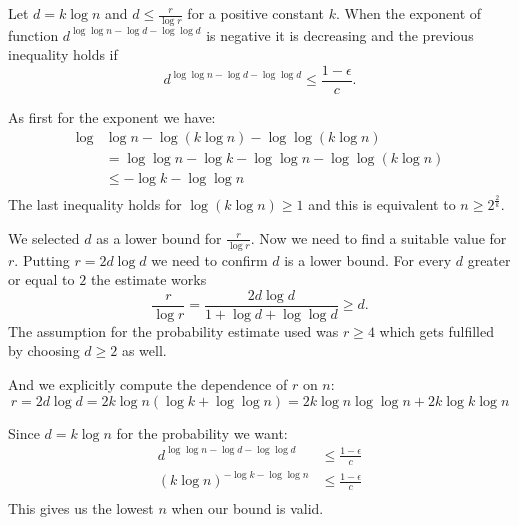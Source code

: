 Let $d = k \log n$ and $d \leq \frac{r}{\log r}$ for a positive constant $k$. When the exponent of function $d^{\log \log n -\log d - \log \log d}$ is negative it is decreasing and the previous inequality holds if
\begin{displaymath}
d ^ {\log \log n - \log d -\log \log d} \leq \frac{1 - \epsilon}{c}\textit{.}
\end{displaymath}

As first for the exponent we have:
\begin{displaymath}
\begin{split}
\log & \log n - \log (k \log n) - \log \log (k \log n) \\
	& = \log \log n - \log k - \log\log n - \log \log (k \log n) \\
	& \leq - \log k - \log \log n \\
\end{split}
\end{displaymath}
The last inequality holds for $\log (k \log n) \geq 1$ and this is equivalent to $n \geq 2^{\frac{2}{k}}$.

We selected $d$ as a lower bound for $\frac{r}{\log r}$. Now we need to find a suitable value for $r$. Putting $r = 2 d \log d$ we need to confirm $d$ is a lower bound. For every $d$ greater or equal to $2$ the estimate works
\begin{displaymath}
\frac{r}{\log r} = \frac{2 d \log d}{1 + \log d + \log \log d} \geq d \textit{.}
\end{displaymath}
The assumption for the probability estimate used was $r \geq 4$ which gets fulfilled by choosing $d \geq 2$ as well.

And we explicitly compute the dependence of $r$ on $n$:
\begin{displaymath}
r = 2 d \log d = 2 k \log n (\log k + \log \log n) = 2 k \log n \log \log n + 2 k \log k \log n
\end{displaymath}



Since $d = k \log n$ for the probability we want:
\begin{displaymath}
\begin{split}
d ^ {\log \log n - \log d -\log \log d} & \leq \frac{1 - \epsilon}{c} \\
\left(k \log n\right)^{-\log k -\log \log n} & \leq \frac{1 - \epsilon}{c} \\
\end{split}
\end{displaymath}
This gives us the lowest $n$ when our bound is valid. 

